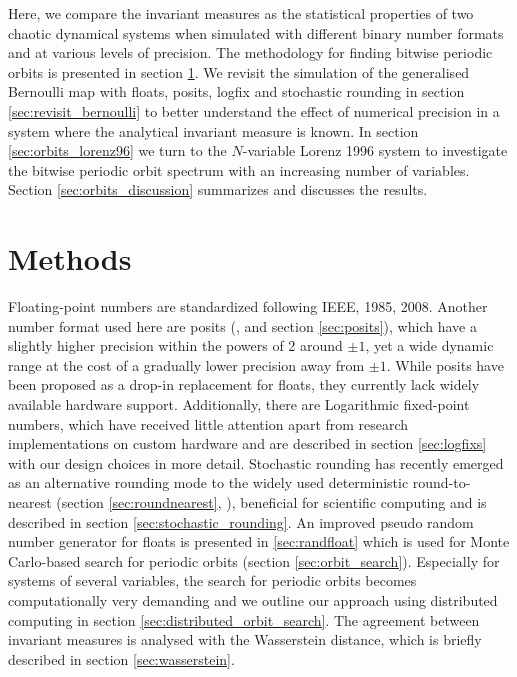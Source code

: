 Here, we compare the invariant measures as the statistical properties of two chaotic dynamical systems when simulated with
different binary number formats and at various levels of precision. The methodology for finding bitwise periodic orbits is presented
in section \ref{sec:orbits_methods}. We revisit the simulation of the generalised Bernoulli map with floats,
posits, logfix and stochastic rounding in section \ref{sec:revisit_bernoulli} to better understand the effect of numerical precision
in a system where the analytical invariant measure is known. In section \ref{sec:orbits_lorenz96} we turn to the $N$-variable Lorenz
1996 system to investigate the bitwise periodic orbit spectrum with an increasing number of variables. Section \ref{sec:orbits_discussion}
summarizes and discusses the results. 

\section{Methods}
\label{sec:orbits_methods}

Floating-point numbers are standardized following IEEE, 1985, 2008. Another number format used here are posits
(\cite{Gustafson2017a}, and section \ref{sec:posits}), which have a slightly higher precision within the powers of 2
around $\pm1$, yet a wide dynamic range at the cost of a gradually lower precision away from $\pm1$. While posits
have been proposed as a drop-in replacement for floats, they currently lack widely available hardware support.
Additionally, there are Logarithmic fixed-point numbers, which have received little attention apart from research
implementations on custom hardware \citep{Johnson2020} and are described in section \ref{sec:logfixs} with our
design choices in more detail. Stochastic rounding has recently emerged as an alternative rounding mode to the
widely used deterministic round-to-nearest (section \ref{sec:roundnearest}, \cite{IEEE1985}), beneficial for scientific computing
\citep{Croci2020,Fasi2021,Hopkins2020,Paxton2021} and is described in section \ref{sec:stochastic_rounding}.
An improved pseudo random number generator for floats is presented in \ref{sec:randfloat} which is used for Monte
Carlo-based search for periodic orbits (section \ref{sec:orbit_search}). Especially for systems of several variables,
the search for periodic orbits becomes computationally very demanding and we outline our approach using
distributed computing in section \ref{sec:distributed_orbit_search}. The agreement between invariant measures
is analysed with the Wasserstein distance, which is briefly described in section \ref{sec:wasserstein}.

